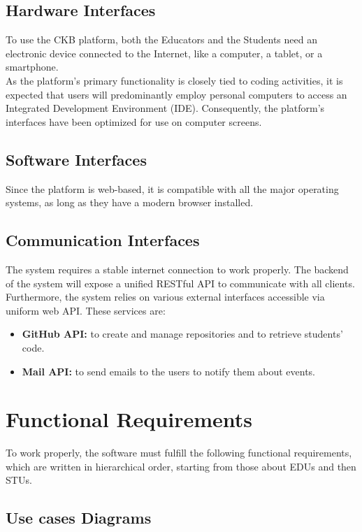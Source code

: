\subsection{Hardware Interfaces}
To use the CKB platform, both the Educators and the Students need an electronic device connected to the Internet, like a computer, a tablet, or a smartphone.\\
As the platform's primary functionality is closely tied to coding activities, it is expected that users will predominantly employ personal computers to access an Integrated Development Environment (IDE). 
Consequently, the platform's interfaces have been optimized for use on computer screens.

\subsection{Software Interfaces}
Since the platform is web-based, it is compatible with all the major operating systems, as long as they have a modern browser installed.

\subsection{Communication Interfaces}
The system requires a stable internet connection to work properly. 
The backend of the system will expose a unified RESTful API to communicate with all clients.\\
Furthermore, the system relies on various external interfaces accessible via uniform web API. 
These services are:
\begin{itemize}
    \item \textbf{GitHub API:} to create and manage repositories and to retrieve students' code.
    \item \textbf{Mail API:} to send emails to the users to notify them about events.
\end{itemize}

\section{Functional Requirements}
To work properly, the software must fulfill the following functional requirements, which are written in hierarchical order, starting from those about EDUs and then STUs.

\subsection{Use cases Diagrams}

